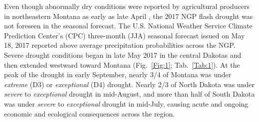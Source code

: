 \documentclass[hess, manuscript]{copernicus}
\begin{document}
Even though abnormally dry conditions were reported by agricultural producers in northeastern Montana as early as late April \citep{MontanaDNRC_2017}, the 2017 NGP flash drought was not foreseen in the seasonal forecast. The U.S. National Weather Service Climate Prediction Center’s (CPC) three-month (JJA) seasonal forecast issued on May 18, 2017 reported above average precipitation probabilities across the NGP. Severe drought conditions \citep[D2 as classified by the U.S. Drought Monitor, USDM,][]{Svoboda_2002} began in late May 2017 in the central Dakotas and then extended westward toward Montana (Fig.~\ref{Fig:1}; Tab.~\ref{Tab:1}). At the peak of the drought in early September, nearly 3/4 of Montana was under \emph{extreme} (D3) or \emph{exceptional} (D4) drought. Nearly 2/3 of North Dakota was under \emph{severe} to \emph{exceptional} drought in mid-August, and more than half of South Dakota was under \emph{severe} to \emph{exceptional} drought in mid-July, causing acute and ongoing economic and ecological consequences across the region. 
\end{document}
